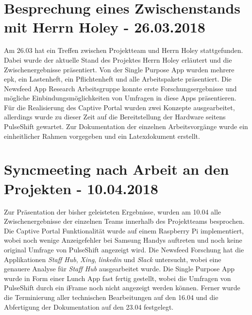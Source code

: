 \section{Besprechung eines Zwischenstands mit Herrn Holey - 26.03.2018}
Am 26.03 hat ein Treffen zwischen Projektteam und Herrn Holey stattgefunden. Dabei wurde der aktuelle Stand des Projektes Herrn Holey erläutert und die Zwischenergebnisse präsentiert. Von der Single Purpose App wurden mehrere \gls{epk}, ein Lastenheft, ein Pflichtenheft und alle Arbeitspakete präsentiert. Die Newsfeed App Research Arbeitsgruppe konnte erste Forschungsergebnisse und mögliche Einbindungsmöglichkeiten von Umfragen in diese Apps präsentieren. Für die Realisierung des Captive Portal wurden zwei Konzepte ausgearbeitet, allerdings wurde zu dieser Zeit auf die Bereitstellung der Hardware seitens PulseShift gewartet. Zur Dokumentation der einzelnen Arbeitsvorgänge wurde ein einheitlicher Rahmen vorgegeben und ein Latexdokument erstellt.

\section{Syncmeeting nach Arbeit an den Projekten - 10.04.2018}
Zur Präsentation der bisher geleisteten Ergebnisse, wurden am 10.04 alle Zwischenergebnisse der einzelnen Teams innerhalb des Projektteams besprochen. Die Captive Portal Funktionalität wurde auf einem Raspberry Pi implementiert, wobei noch wenige Anzeigefehler bei Samsung Handys auftreten und noch keine original Umfrage von PulseShift angezeigt wird. Die Newsfeed Forschung hat die Applikationen \textit{Staff Hub}, \textit{Xing}, \textit{linkedin} und \textit{Slack} untersucht, wobei eine genauere Analyse für \textit{Staff Hub} ausgearbeitet wurde. Die Single Purpose App wurde in Form einer Lunch App fast fertig gestellt, wobei die Umfragen von PulseShift durch ein iFrame noch nicht angezeigt werden können. Ferner wurde die Terminierung aller technischen Bearbeitungen auf den 16.04 und die Abfertigung der Dokumentation auf den 23.04 festgelegt.